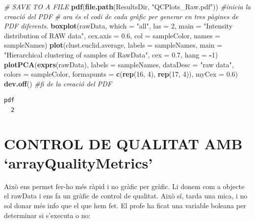 \documentclass[
]{article}
\newenvironment{Shaded}{\begin{snugshade}}{\end{snugshade}}
\newcommand{\AttributeTok}[1]{\textcolor[rgb]{0.13,0.29,0.53}{#1}}
\newcommand{\CommentTok}[1]{\textcolor[rgb]{0.56,0.35,0.01}{\textit{#1}}}
\newcommand{\DecValTok}[1]{\textcolor[rgb]{0.00,0.00,0.81}{#1}}
\newcommand{\FloatTok}[1]{\textcolor[rgb]{0.00,0.00,0.81}{#1}}
\newcommand{\FunctionTok}[1]{\textcolor[rgb]{0.13,0.29,0.53}{\textbf{#1}}}
\newcommand{\NormalTok}[1]{#1}
\newcommand{\SpecialCharTok}[1]{\textcolor[rgb]{0.81,0.36,0.00}{\textbf{#1}}}
\newcommand{\StringTok}[1]{\textcolor[rgb]{0.31,0.60,0.02}{#1}}
\begin{document}
\begin{Shaded}
\begin{Highlighting}[]
\CommentTok{\# SAVE TO A FILE}
\FunctionTok{pdf}\NormalTok{(}\FunctionTok{file.path}\NormalTok{(ResultsDir, }\StringTok{"QCPlots\_Raw.pdf"}\NormalTok{))  }\CommentTok{\#inicia la creació del PDF}
\CommentTok{\# ara és el codi de cada gràfic per generar en tres \textquotesingle{}pàgines\textquotesingle{} de PDF diferents.}
\FunctionTok{boxplot}\NormalTok{(rawData, }\AttributeTok{which =} \StringTok{"all"}\NormalTok{, }\AttributeTok{las =} \DecValTok{2}\NormalTok{, }\AttributeTok{main =} \StringTok{"Intensity distribution of RAW data"}\NormalTok{,}
    \AttributeTok{cex.axis =} \FloatTok{0.6}\NormalTok{, }\AttributeTok{col =}\NormalTok{ sampleColor, }\AttributeTok{names =}\NormalTok{ sampleNames)}
\FunctionTok{plot}\NormalTok{(clust.euclid.average, }\AttributeTok{labels =}\NormalTok{ sampleNames, }\AttributeTok{main =} \StringTok{"Hierarchical clustering of samples of RawData"}\NormalTok{,}
    \AttributeTok{cex =} \FloatTok{0.7}\NormalTok{, }\AttributeTok{hang =} \SpecialCharTok{{-}}\DecValTok{1}\NormalTok{)}
\FunctionTok{plotPCA}\NormalTok{(}\FunctionTok{exprs}\NormalTok{(rawData), }\AttributeTok{labels =}\NormalTok{ sampleNames, }\AttributeTok{dataDesc =} \StringTok{"raw data"}\NormalTok{, }\AttributeTok{colors =}\NormalTok{ sampleColor,}
    \AttributeTok{formapunts =} \FunctionTok{c}\NormalTok{(}\FunctionTok{rep}\NormalTok{(}\DecValTok{16}\NormalTok{, }\DecValTok{4}\NormalTok{), }\FunctionTok{rep}\NormalTok{(}\DecValTok{17}\NormalTok{, }\DecValTok{4}\NormalTok{)), }\AttributeTok{myCex =} \FloatTok{0.6}\NormalTok{)}
\FunctionTok{dev.off}\NormalTok{()  }\CommentTok{\#fi de la creació del PDF}
\end{Highlighting}
\end{Shaded}

\begin{verbatim}
pdf 
  2 
\end{verbatim}

\section{CONTROL DE QUALITAT AMB
`arrayQualityMetrics'}\label{control-de-qualitat-amb-arrayqualitymetrics}

Això ens permet fer-ho més ràpid i no gràfic per gràfic. Li donem com a
objecte el rawData i ens fa un gràfic de control de qualitat. Això sí,
tarda una mica, i no sol donar més info que el que hem fet. El profe ha
ficat una variable boleana per determinar si s'executa o no:
\end{document}
